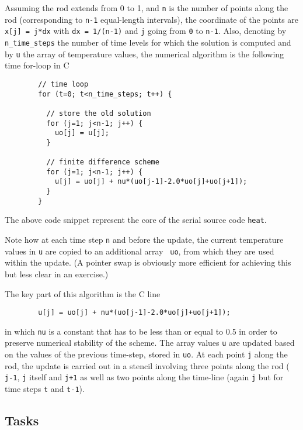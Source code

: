 \documentclass[a4paper, 12pt]{article}
\def \cc   {\tt }               %
\begin{document}
Assuming the rod extends from 0 to 1, and {\cc n} is the number of
points along the rod (corresponding to {\cc n-1} equal-length
intervals), the coordinate of the points are {\cc x[j] = j*dx} with
{\cc dx = 1/(n-1)} and {\cc j} going from {\cc 0} to {\cc n-1}.
Also, denoting by {\cc n\_time\_steps} the number of
time levels for which the solution is computed and by {\cc u} the
array of temperature values, the numerical algorithm is the following
time for-loop in C
%
\begin{verbatim}
        // time loop
        for (t=0; t<n_time_steps; t++) {

          // store the old solution
          for (j=1; j<n-1; j++) {
            uo[j] = u[j];
          }

          // finite difference scheme
          for (j=1; j<n-1; j++) {
            u[j] = uo[j] + nu*(uo[j-1]-2.0*uo[j]+uo[j+1]);
          }
        }
\end{verbatim}
%

The above code snippet represent the core of the serial source code {\cc heat}.

Note how at each time step {\cc n} and before the update, the current
temperature values in {\cc u} are copied to an additional array {\cc
  uo}, from which they are used within the update.  (A pointer swap is
obviously more efficient for achieving this but less clear in an
exercise.)

The key part of this algorithm is the C line
%
\begin{verbatim}
        u[j] = uo[j] + nu*(uo[j-1]-2.0*uo[j]+uo[j+1]);
\end{verbatim}
%

in which {\cc nu} is a constant that has to be less than or equal to 0.5 in
order to preserve numerical stability of the scheme.  The array values
{\cc u} are updated based on the values of the previous time-step,
stored in {\cc uo}.  At each point {\cc j} along the rod, the update
is carried out in a stencil involving three points along the rod ({\cc
  j-1}, {\cc j} itself and {\cc j+1} as well as two points along the
time-line (again {\cc j} but for time steps {\cc t} and {\cc t-1}).

\subsection*{Tasks}
\end{document}
